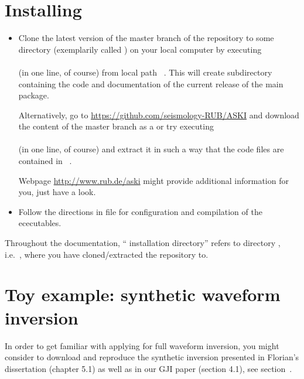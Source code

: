 \section*{Installing \ASKI} %
%
\begin{itemize}
\item Clone the latest version of the master branch of the \ASKI{}  repository to some directory 
  (exemplarily called ) on your local computer by executing\\
  \\
  (in one line, of course) from local path ~. This will create subdirectory  containing
  the code and documentation of the current release of the \ASKI{} main package.

  Alternatively, go to \url{https://github.com/seismology-RUB/ASKI} and download the content of the master branch
  as a  or try executing\\
  \\
  (in one line, of course) and extract it in such a way that the code files are contained in ~.

  Webpage \url{http://www.rub.de/aski} might provide additional information for you, just have a look.
\item Follow the directions in file  for configuration and compilation of the \ASKI{} ececutables.
\end{itemize}
Throughout the \ASKI{} documentation, ``\ASKI{} installation directory'' refers to directory , i.e.\
, where you have cloned/extracted the  repository to.
%
\section*{Toy example: synthetic waveform inversion}
%
In order to get familiar with applying \ASKI{} for full waveform inversion, you might consider to 
download and reproduce the synthetic inversion presented in Florian's dissertation 
\cite{_743d334d-dfa4-4a16-8cc5-91cdadc95271} (chapter 5.1) as well as in our GJI paper \cite{Schumacher16} 
(section 4.1), see section~\myref{guide,sec:example_C_borehole}.
%
